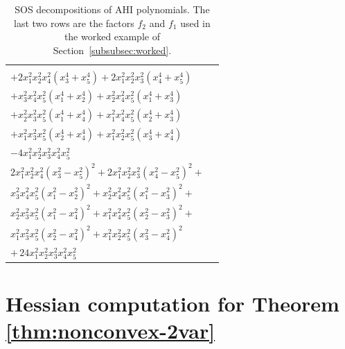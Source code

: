 \documentclass[12pt]{elsarticle}
\theoremstyle{definition}
\begin{document}
\begin{table}[h!]
\begin{tabular}{|p{7cm}|p{7cm}|}
    \begin{minipage}{7cm}
\vspace{5pt}
$2 x_2^2 x_3^2 x_4^2 (x_1^4 + x_5^4) + 2 x_1^2 x_3^2 x_4^2 (x_2^4 + x_5^4)$ \\
$+ 2 x_1^2 x_2^2 x_4^2 (x_3^4 + x_5^4) + 2 x_1^2 x_2^2 x_3^2 (x_4^4 + x_5^4)$ \\
$+ x_3^2 x_4^2 x_5^2 (x_1^4 + x_2^4) + x_2^2 x_4^2 x_5^2 (x_1^4 + x_3^4)$ \\
$+ x_2^2 x_3^2 x_5^2 (x_1^4 + x_4^4) + x_1^2 x_4^2 x_5^2 (x_2^4 + x_3^4)$ \\
$+ x_1^2 x_3^2 x_5^2 (x_2^4 + x_4^4) + x_1^2 x_2^2 x_5^2 (x_3^4 + x_4^4)$ \\
$- 4 x_1^2 x_2^2 x_3^2 x_4^2 x_5^2$
\vspace{5pt}
\end{minipage} &
\begin{minipage}{7cm}
\vspace{5pt}
$2 x_2^2 x_3^2 x_4^2 (x_1^2 - x_5^2)^2 +
2 x_1^2 x_3^2 x_4^2 (x_2^2 - x_5^2)^2 +$ \\
$ 2 x_1^2 x_2^2 x_4^2 (x_3^2 - x_5^2)^2 +
2 x_1^2 x_2^2 x_3^2 (x_4^2 - x_5^2)^2 +$ \\
$ x_3^2 x_4^2 x_5^2 (x_1^2 - x_2^2)^2 +
x_2^2 x_4^2 x_5^2 (x_1^2 - x_3^2)^2 +$ \\
$ x_2^2 x_3^2 x_5^2 (x_1^2 - x_4^2)^2 +
x_1^2 x_4^2 x_5^2 (x_2^2 - x_3^2)^2 +$ \\
$ x_1^2 x_3^2 x_5^2 (x_2^2 - x_4^2)^2 +
x_1^2 x_2^2 x_5^2 (x_3^2 - x_4^2)^2$ \\
$+\,24 x_1^2 x_2^2 x_3^2 x_4^2 x_5^2$
\vspace{5pt}
\end{minipage} \\ \hline

     \end{tabular}
      \caption{SOS decompositions of AHI polynomials. The last two rows are the factors $f_2$ and $f_1$ used in the worked example of Section~\ref{subsubsec:worked}.}
    \label{tab:sos_cases}
\end{table}

\clearpage

\section{Hessian computation for Theorem \texorpdfstring{\ref{thm:nonconvex-2var}}{4.1}}\label{app:hessian}
\end{document}
